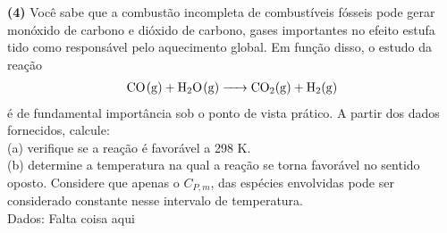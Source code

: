 \textbf{(4)} Você sabe que a combustão incompleta de combustíveis fósseis
pode gerar monóxido de carbono e dióxido de carbono, gases importantes no efeito
estufa tido como responsável pelo aquecimento global. Em função disso, o estudo
da reação
\begin{align*}
    \ce{CO(g) + H2O(g) -> CO2(g) + H2(g)}
\end{align*}
é de fundamental importância sob o ponto de vista prático. A partir dos dados fornecidos,
calcule:\\

(a) verifique se a reação é favorável a 298 K.\\

(b) determine a temperatura na qual a reação se torna favorável no sentido
oposto. Considere que apenas o \(C_{P,m}\), das espécies envolvidas pode ser
considerado constante nesse intervalo de temperatura.\\

Dados: Falta coisa aqui
